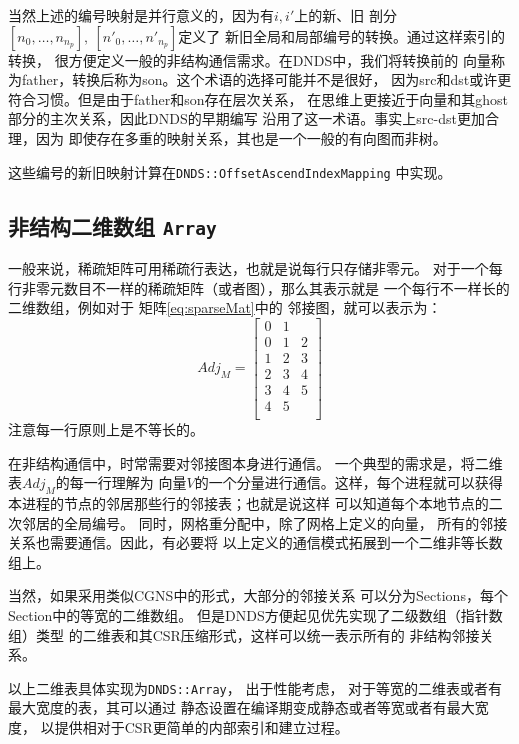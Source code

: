 \documentclass[UTF8,zihao=5]{ctexart} %
\begin{document}
当然上述的编号映射是并行意义的，因为有$i,i'$上的新、旧
剖分$[n_0,\dots,n_{n_p}],\ [n'_0,\dots,n'_{n_p}]$定义了
新旧全局和局部编号的转换。通过这样索引的转换，
很方便定义一般的非结构通信需求。在DNDS中，我们将转换前的
向量称为father，转换后称为son。这个术语的选择可能并不是很好，
因为src和dst或许更符合习惯。但是由于father和son存在层次关系，
在思维上更接近于向量和其ghost部分的主次关系，因此DNDS的早期编写
沿用了这一术语。事实上src-dst更加合理，因为
即使存在多重的映射关系，其也是一个一般的有向图而非树。

这些编号的新旧映射计算在\verb|DNDS::OffsetAscendIndexMapping|
中实现。

\subsection{非结构二维数组 \texttt{Array}}

一般来说，稀疏矩阵可用稀疏行表达，也就是说每行只存储非零元。
对于一个每行非零元数目不一样的稀疏矩阵（或者图），那么其表示就是
一个每行不一样长的二维数组，例如对于
矩阵\ref{eq:sparseMat}中的
邻接图，就可以表示为：
\begin{equation}
    Adj_M = \begin{bmatrix}
        0 & 1 &   \\
        0 & 1 & 2 \\
        1 & 2 & 3 \\
        2 & 3 & 4 \\
        3 & 4 & 5 \\
        4 & 5 &   \\
    \end{bmatrix}
\end{equation}
注意每一行原则上是不等长的。

在非结构通信中，时常需要对邻接图本身进行通信。
一个典型的需求是，将二维表$Adj_M$的每一行理解为
向量$V$的一个分量进行通信。这样，每个进程就可以获得
本进程的节点的邻居那些行的邻接表；也就是说这样
可以知道每个本地节点的二次邻居的全局编号。
同时，网格重分配中，除了网格上定义的向量，
所有的邻接关系也需要通信。因此，有必要将
以上定义的通信模式拓展到一个二维非等长数组上。

当然，如果采用类似CGNS中的形式，大部分的邻接关系
可以分为Sections，每个Section中的等宽的二维数组。
但是DNDS方便起见优先实现了二级数组（指针数组）类型
的二维表和其CSR压缩形式，这样可以统一表示所有的
非结构邻接关系。

以上二维表具体实现为\verb|DNDS::Array|，
出于性能考虑，
对于等宽的二维表或者有最大宽度的表，其可以通过
静态设置在编译期变成静态或者等宽或者有最大宽度，
以提供相对于CSR更简单的内部索引和建立过程。
\end{document}
